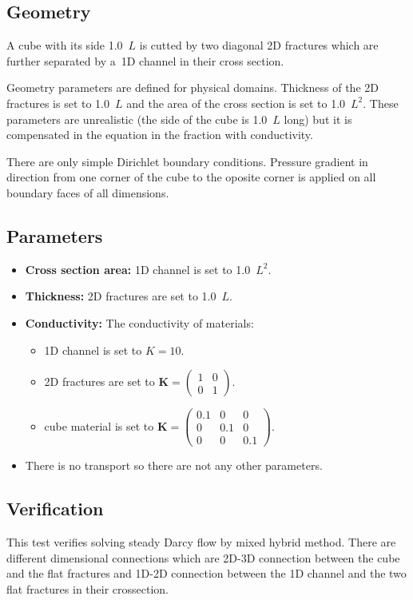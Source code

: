 \subsection*{Geometry}
A cube with its side 1.0~$L$ is cutted by two diagonal 2D fractures which are further separated by a~1D channel in their cross section.

Geometry parameters are defined for physical domains. Thickness of the 2D fractures is set to 1.0~$L$ and the area of the cross section is set to 1.0~$L^2$. These parameters are unrealistic (the side of the cube is 1.0~$L$ long) but it is compensated in the equation in the fraction with conductivity.

There are only simple Dirichlet boundary conditions. Pressure gradient in direction from one corner of the cube to the oposite corner is applied on all boundary faces of all dimensions.

\subsection*{Parameters}
\begin{itemize}
  \item \textbf{Cross section area:} 1D channel is set to 1.0~$L^2$.
  \item \textbf{Thickness:} 2D fractures are set to 1.0~$L$.
  \item \textbf{Conductivity:} The conductivity of materials:
    \begin{itemize}
      \item 1D channel is set to $K=10$.
      \item 2D fractures are set to $\mathbf{K}=\left(\begin{array}{cc} 1 & 0 \\ 0 & 1\end{array} \right)$.
      \item cube material is set to $\mathbf{K}=\left(\begin{array}{ccc} 0.1 & 0 & 0 \\ 0 & 0.1 & 0 \\ 0 & 0 & 0.1\end{array} \right)$.
    \end{itemize}
  \item There is no transport so there are not any other parameters.
\end{itemize}

\subsection*{Verification}
This test verifies solving steady Darcy flow by mixed hybrid method. There are different dimensional connections which are 2D-3D connection between the cube and the flat fractures and 1D-2D connection between the 1D channel and the two flat fractures in their crossection.

